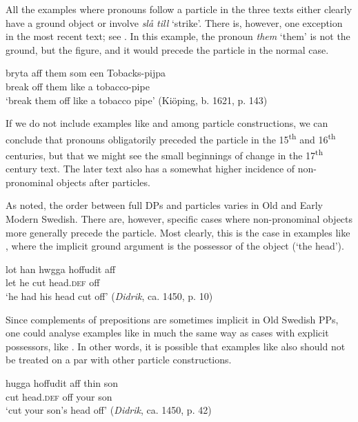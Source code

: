 \documentclass[output=paper]{langscibook}
\begin{document}
All the examples where pronouns follow a particle in the three texts either clearly have a ground object or involve \textit{slå till} ‘strike’. There is, however, one exception in the most recent text; see . In this example, the pronoun \textit{them} ‘them’ is not the ground, but the figure, and it would precede the particle in the normal case.


\ea\label{ex:lalu:29}
\gll  bryta     aff   them   som   een     Tobacks-pijpa\\
break   off   them   like     a     tobacco-pipe\\
\glt `break them off like a tobacco pipe’ (Kiöping, b. 1621, p. 143)\\
\z


If we do not include examples like  and  among particle constructions, we can conclude that pronouns obligatorily preceded the particle in the 15\textsuperscript{th} and 16\textsuperscript{th} centuries, but that we might see the small beginnings of change in the 17\textsuperscript{th} century text. The later text also has a somewhat higher incidence of non-pronominal objects after particles.



As noted, the order between full DPs and particles varies in Old and Early Modern Swedish. There are, however, specific cases where non-pronominal objects more generally precede the particle. Most clearly, this is the case in examples like , where the implicit ground argument is the possessor of the object (‘the head’).


\ea\label{ex:lalu:30}
\gll  lot    han   hwgga   hoffudit aff\\
let    he   cut     head.\textsc{def}   off \\
\glt `he had his head cut off’ (\textit{Didrik}, ca. 1450, p. 10)\\
\z


Since complements of prepositions are sometimes implicit in Old Swedish PPs, one could analyse examples like  in much the same way as cases with explicit possessors, like . In other words, it is possible that examples like  also should not be treated on a par with other particle constructions.


\ea\label{ex:lalu:31}
\gll  hugga   hoffudit       aff     thin     son\\
cut         head.\textsc{def}   off   your   son\\
\glt `cut your son’s head off’ (\textit{Didrik}, ca. 1450, p. 42)\\
\z
\end{document}
